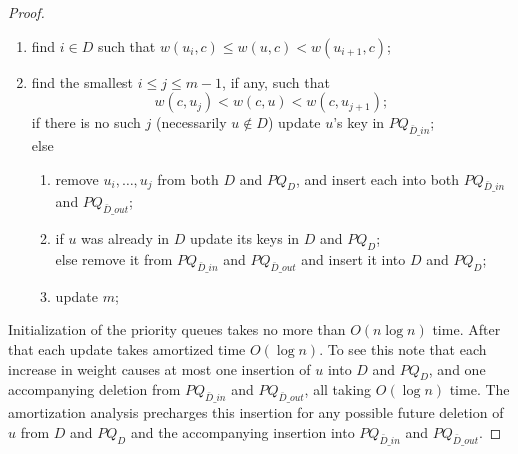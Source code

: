\begin{proof}
\begin{enumerate}
	\item find $i\in D$ such that $w(u_i,c)\leq w(u,c)< w(u_{i+1},c)$; 
	\item find the smallest $i\leq j\leq m-1$, if any, such that 
	$$w(c,u_j)< w(c,u)<w(c,u_{j+1});$$
	if there is no such $j$ (necessarily $u\notin D$) update $u$'s key in $PQ_{\bar{D}\_in}$; \\
	else
	\begin{enumerate}
		\item  remove $u_i, \ldots ,u_j$ from both $D$ and $PQ_D$, and insert each into both
	       $PQ_{\bar{D}\_in}$ and $PQ_{\bar{D}\_out}$;
	    \item  if $u$ was already in $D$ update its keys in $D$ and $PQ_D$;\\
	     else remove it from $PQ_{\bar{D}\_in}$ and $PQ_{\bar{D}\_out}$
	     and insert it into $D$ and $PQ_D$; 
	    \item update $m$;
		\end{enumerate}
\end{enumerate}

Initialization of the priority queues takes no more than $O(n \log n)$ time. 
After that each update takes amortized 
time $O(\log n)$. To see this note that each increase in weight causes at most one 
insertion of $u$ into $D$ and $PQ_D$, and one accompanying deletion from 
$PQ_{\bar{D}\_in}$ and $PQ_{\bar{D}\_out}$, all taking $O(\log n)$ time. 
The amortization analysis precharges this insertion for any
possible future deletion of $u$ from $D$ and $PQ_D$ and the accompanying insertion
into $PQ_{\bar{D}\_in}$ and $PQ_{\bar{D}\_out}$.
\end{proof}
%
